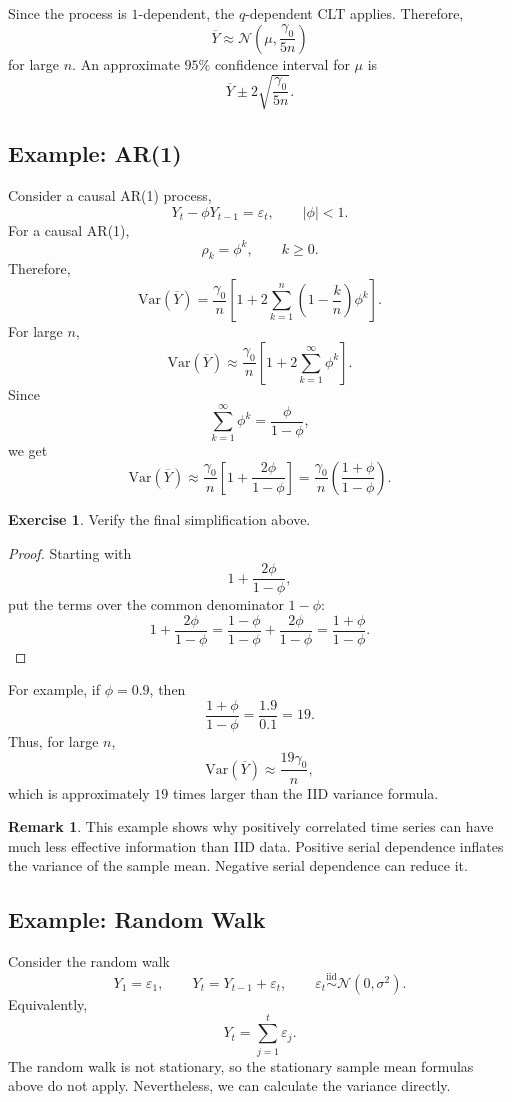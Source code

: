 \documentclass[12pt,oneside]{book}
\numberwithin{equation}{section}
\theoremstyle{definition}
\newtheorem{exercise}{Exercise}[section]
\newtheorem{remark}{Remark}[section]
\theoremstyle{plain}
\theoremstyle{remark}
\newcommand{\Var}{\mathrm{Var}}
\newcommand{\iid}{\overset{\text{iid}}{\sim}}
\newcommand{\Normal}{\mathcal{N}}
\begin{document}
Since the process is $1$-dependent, the $q$-dependent CLT applies. Therefore,
\[
\overline{Y}
\approx
\Normal\left(\mu,\frac{\gamma_0}{5n}\right)
\]
for large $n$. An approximate $95\%$ confidence interval for $\mu$ is
\[
\overline{Y}\pm 2\sqrt{\frac{\gamma_0}{5n}}.
\]

\subsection*{Example: AR(1)}

Consider a causal AR(1) process,
\[
Y_t-\phi Y_{t-1}=\varepsilon_t,
\qquad
|\phi|<1.
\]
For a causal AR(1),
\[
\rho_k=\phi^k,
\qquad k\geq 0.
\]
Therefore,
\[
\Var(\overline{Y})
=
\frac{\gamma_0}{n}
\left[
1+2\sum_{k=1}^{n}
\left(1-\frac{k}{n}\right)\phi^k
\right].
\]
For large $n$,
\[
\Var(\overline{Y})
\approx
\frac{\gamma_0}{n}
\left[
1+2\sum_{k=1}^{\infty}\phi^k
\right].
\]
Since
\[
\sum_{k=1}^{\infty}\phi^k
=
\frac{\phi}{1-\phi},
\]
we get
\[
\Var(\overline{Y})
\approx
\frac{\gamma_0}{n}
\left[
1+\frac{2\phi}{1-\phi}
\right]
=
\frac{\gamma_0}{n}
\left(
\frac{1+\phi}{1-\phi}
\right).
\]

\begin{exercise}
Verify the final simplification above.
\end{exercise}

\begin{proof}
Starting with
\[
1+\frac{2\phi}{1-\phi},
\]
put the terms over the common denominator $1-\phi$:
\[
1+\frac{2\phi}{1-\phi}
=
\frac{1-\phi}{1-\phi}
+
\frac{2\phi}{1-\phi}
=
\frac{1+\phi}{1-\phi}.
\]
\end{proof}

For example, if $\phi=0.9$, then
\[
\frac{1+\phi}{1-\phi}
=
\frac{1.9}{0.1}
=
19.
\]
Thus, for large $n$,
\[
\Var(\overline{Y})
\approx
\frac{19\gamma_0}{n},
\]
which is approximately $19$ times larger than the IID variance formula.

\begin{remark}
This example shows why positively correlated time series can have much less effective information than IID data. Positive serial dependence inflates the variance of the sample mean. Negative serial dependence can reduce it.
\end{remark}

\subsection*{Example: Random Walk}

Consider the random walk
\[
Y_1=\varepsilon_1,
\qquad
Y_t=Y_{t-1}+\varepsilon_t,
\qquad
\varepsilon_t \iid \Normal(0,\sigma^2).
\]
Equivalently,
\[
Y_t=\sum_{j=1}^t\varepsilon_j.
\]
The random walk is not stationary, so the stationary sample mean formulas above do not apply. Nevertheless, we can calculate the variance directly.
\end{document}
